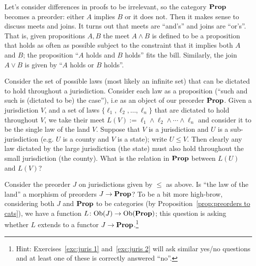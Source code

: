 \documentclass[CT4S-EN-RU]{subfiles}
\begin{document}
\begin{exampleRUS}
\end{exampleRUS}

\begin{blockENG}
Let's consider differences in proofs to be irrelevant, so the category ${\mathbf{Prop}}$ becomes a preorder: either $A$ implies $B$ or it does not. Then it makes sense to discuss meets and joins. It turns out that meets are “and's” and joins are “or's”. That is, given propositions $A,B$ the meet $A\wedge B$ is defined to be a proposition that holds as often as possible subject to the constraint that it implies both $A$ and $B$; the proposition “$A$ holds and $B$ holds” fits the bill. Similarly, the join $A\vee B$ is given by “$A$ holds or $B$ holds”.
\end{blockENG}

\begin{blockRUS}
\end{blockRUS}

\begin{exerciseENG}\label{exc:juris 1}
Consider the set of possible laws (most likely an infinite set) that can be dictated to hold throughout a jurisdiction. Consider each law as a proposition (“such and such is (dictated to be) the case”), i.e as an object of our preorder ${\mathbf{Prop}}$. Given a jurisdiction $V$, and a set of laws $\{\ell_1,\ell_2,\ldots,\ell_n\}$ that are dictated to hold throughout $V$, we take their meet $L(V):=\ell_1\wedge\ell_2\wedge\cdots\wedge\ell_n$ and consider it to be the single law of the land $V$. Suppose that $V$ is a jurisdiction and $U$ is a sub-jurisdiction (e.g. $U$ is a county and $V$ is a state); write $U\leq V$. Then clearly any law dictated by the large jurisdiction (the state) must also hold throughout the small jurisdiction (the county).
\sexc What is the relation in ${\mathbf{Prop}}$ between $L(U)$ and $L(V)$?
\item Consider the preorder $J$ on jurisdictions given by $\leq$ as above. Is “the law of the land” a morphism of preorders $J\rightarrow{\mathbf{Prop}}$? To be a bit more high-brow, considering both $J$ and ${\mathbf{Prop}}$ to be categories (by Proposition~\ref{prop:preorders to cats}), we have a function $L\colon\textnormal{Ob}(J)\rightarrow\textnormal{Ob}({\mathbf{Prop}})$; this question is asking whether $L$ extends to a functor $J\rightarrow{\mathbf{Prop}}$.\footnote{Hint: Exercises~\ref{exc:juris 1} and~\ref{exc:juris 2} will ask similar yes/no questions and at least one of these is correctly answered “no”.}
\endsexc
\end{exerciseENG}

\begin{exerciseRUS}\label{exc:juris 1}
\end{exerciseRUS}
\end{document}
